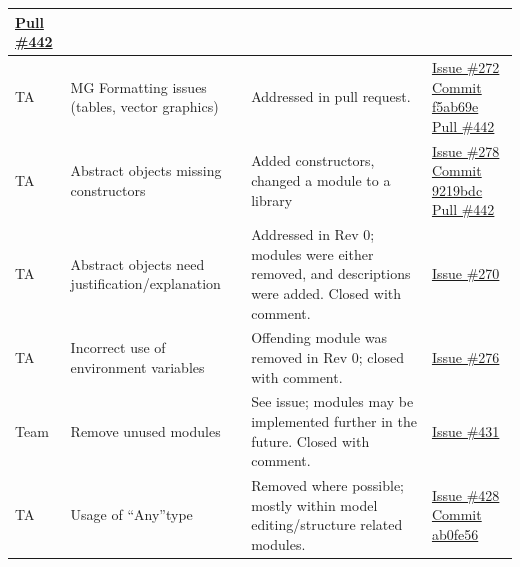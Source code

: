 \documentclass[12pt, titlepage]{article}
\begin{document}
\begin{longtable}{|p{2cm}|p{4cm}|p{5cm}|p{3cm}|}
\newline\href{https://github.com/OmarHassanAdelhamid/Five-of-a-Kind-capstone-project-/pull/442}{Pull \#442} \\ \hline
TA & MG Formatting issues (tables, vector graphics) & Addressed in pull request. & \href{https://github.com/OmarHassanAdelhamid/Five-of-a-Kind-capstone-project-/issues/272}{Issue \#272}
\newline\href{https://github.com/OmarHassanAdelhamid/Five-of-a-Kind-capstone-project-/pull/442/commits/f5ab69ed317064499814f008bf446b8cde2b4949}{Commit f5ab69e}
\newline\href{https://github.com/OmarHassanAdelhamid/Five-of-a-Kind-capstone-project-/pull/442}{Pull \#442} \\ \hline
TA & Abstract objects missing constructors & Added constructors, changed a module to a library & \href{https://github.com/OmarHassanAdelhamid/Five-of-a-Kind-capstone-project-/issues/278}{Issue \#278}
\newline\href{https://github.com/OmarHassanAdelhamid/Five-of-a-Kind-capstone-project-/pull/442/commits/9219bdc9adbb85357c92589046f6d2d218d4c8fb}{Commit 9219bdc}
\newline\href{https://github.com/OmarHassanAdelhamid/Five-of-a-Kind-capstone-project-/pull/442}{Pull \#442} \\ \hline
TA & Abstract objects need justification/explanation & Addressed in Rev 0; modules were either removed, and descriptions were added. Closed with comment. & \href{https://github.com/OmarHassanAdelhamid/Five-of-a-Kind-capstone-project-/issues/270}{Issue \#270} \\ \hline
TA & Incorrect use of environment variables & Offending module was removed in Rev 0; closed with comment. & \href{https://github.com/OmarHassanAdelhamid/Five-of-a-Kind-capstone-project-/issues/276}{Issue \#276} \\ \hline
Team & Remove unused modules & See issue; modules may be implemented further in the future. Closed with comment. & \href{https://github.com/OmarHassanAdelhamid/Five-of-a-Kind-capstone-project-/issues/431}{Issue \#431} \\ \hline
TA & Usage of ``Any''type & Removed where possible; mostly within model editing/structure related modules. & \href{https://github.com/OmarHassanAdelhamid/Five-of-a-Kind-capstone-project-/issues/428}{Issue \#428}
\newline\href{https://github.com/OmarHassanAdelhamid/Five-of-a-Kind-capstone-project-/pull/460/commits/ab0fe5610fd5f6aec7be4830c39b80b6081480b5}{Commit ab0fe56}

\end{longtable}
\end{document}
